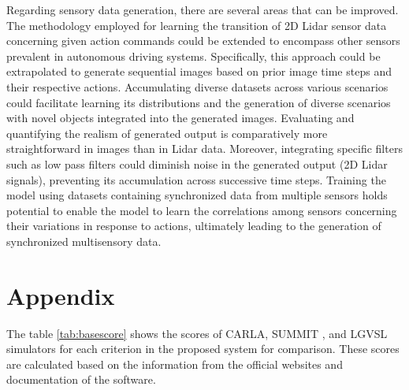 \documentclass[12pt,twoside,a4paper,parskip]{scrbook} %
\begin{document}
Regarding sensory data generation, there are several areas that can be improved. The methodology employed for learning the transition of 2D Lidar sensor data concerning given action commands could be extended to encompass other sensors prevalent in autonomous driving systems. Specifically, this approach could be extrapolated to generate sequential images based on prior image time steps and their respective actions. Accumulating diverse datasets across various scenarios could facilitate learning its distributions and the generation of diverse scenarios with novel objects integrated into the generated images. Evaluating and quantifying the realism of generated output is comparatively more straightforward in images than in Lidar data. Moreover, integrating specific filters such as low pass filters could diminish noise in the generated output (2D Lidar signals), preventing its accumulation across successive time steps. Training the model using datasets containing synchronized data from multiple sensors holds potential to enable the model to learn the correlations among sensors concerning their variations in response to actions, ultimately leading to the generation of synchronized multisensory data.


\backmatter

\listoffigures

\listoftables
\setcounter{chapter}{1}
\renewcommand{\thechapter}{\Alph{chapter}}
\chapter*{Appendix}\label{appendix}
The table \ref{tab:basescore} shows the scores of CARLA\cite{carla-docs}, SUMMIT \cite{summit-docs}, and LGVSL\cite{lgvsl-docs} simulators for each criterion in the proposed system for comparison. These scores are calculated based on the information from the official websites and documentation of the software.
\end{document}
